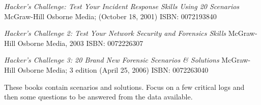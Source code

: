 \documentclass[20pt,landscape,a4paper,footrule]{foils}
\begin{document}
\begin{list1}
\item \emph{Hacker's Challenge: Test Your Incident Response Skills Using 20 Scenarios} McGraw-Hill Osborne Media; (October 18, 2001) ISBN:
 0072193840
\item \emph{Hacker's Challenge 2: Test Your Network Security and
 Forensics Skills} McGraw-Hill Osborne Media, 2003 ISBN: 0072226307
\item \emph{Hacker's Challenge 3: 20 Brand New Forensic Scenarios \& Solutions} McGraw-Hill Osborne Media; 3 edition (April 25, 2006) ISBN: 0072263040
\item These books contain scenarios and solutions. Focus on a few critical logs and then some questions to be answered from the data available.
\end{list1}
\end{document}
